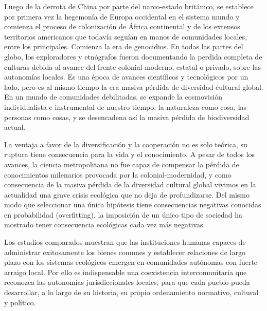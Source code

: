 \documentclass[a4paper,11pt]{book}
\theoremstyle{definition}
\begin{document}
%
Luego de la derrota de China por parte del narco-estado británico, se establece por primera vez la hegemonía de Europa occidental en el sistema mundo y comienza el proceso de colonización de África continental y de los extensos territorios americanos que todavía seguían en manos de comunidades locales, entre los principales.
%
Comienza la era de genocidios.
%
En todas las partes del globo, los exploradores y etnógrafos fueron documentando la perdida completa de culturas debida al avance del frente colonial-moderno, estatal o privado, sobre las autonomías locales.
Es una época de avances científicos y tecnológicos por un lado, pero es al mismo tiempo la era masiva pérdida de diversidad cultural global.
%
%
%
En un mundo de comunidades debilitadas, se expande la cosmovisión individualista e instrumental de nuestro tiempo, la naturaleza como cosa, las personas como cosas, y se desencadena así la masiva pérdida de biodiversidad actual.


La ventaja a favor de la diversificación y la cooperación no es solo teórica, su ruptura tiene consecuencia para la vida y el conocimiento.
%
A pesar de todos los avances, la ciencia metropolitana no fue capaz de compensar la pérdida de conocimientos milenarios provocada por la colonial-modernidad, y como consecuencia de la masiva pérdida de la diversidad cultural global vivimos en la actualidad una grave crisis ecológica que no deja de profundizarse.
Del mismo modo que seleccionar una única hipótesis tiene consecuencias negativas conocidas en probabilidad (overfitting), la imposición de un único tipo de sociedad ha mostrado tener consecuencia ecológicas cada vez más negativas.


Los estudios comparados muestran que las instituciones humanas capaces de administrar exitosamente los bienes comunes y establecer relaciones de largo plazo con los sistemas ecológicos emergen en comunidades autónomas con fuerte arraigo local.
%
Por ello es indispensable una coexistencia intercomunitaria que reconozca las autonomías jurisdiccionales locales, para que cada pueblo pueda desarrollar, a lo largo de su historia, su propio ordenamiento normativo, cultural y político.
\end{document}
